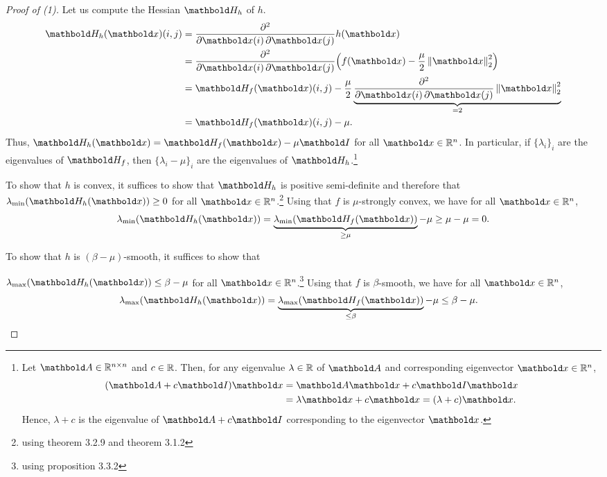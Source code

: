 \documentclass{tufte-handout}
\begin{document}
\begin{proof}[Proof of (1)] Let us compute the Hessian $\mH_h$ of $h$. \begin{align*}
    \mH_h(\vx)(i,j) &= \pdv{}{\vx(i),\vx(j)} h(\vx) \\
    &= \pdv{}{\vx(i),\vx(j)} \parentheses*{f(\vx) - \frac{\mu}{2} \norm{\vx}_2^2} \\
    &= \mH_f(\vx)(i,j) - \frac{\mu}{2} \underbrace{\pdv{}{\vx(i),\vx(j)} \norm{\vx}_2^2}_{=2} \\
    &= \mH_f(\vx)(i,j) - \mu.
\end{align*} Thus, $\mH_h(\vx) = \mH_f(\vx) - \mu \mI$ for all $\vx \in \R^n$. In particular, if $\{\lambda_i\}_i$ are the eigenvalues of $\mH_f$, then $\{\lambda_i - \mu\}_i$ are the eigenvalues of $\mH_h$.\footnote{Let $\mA \in \R^{n \times n}$ and $c \in \mathbb{R}$. Then, for any eigenvalue $\lambda \in \mathbb{R}$ of $\mA$ and corresponding eigenvector $\vx \in \R^n$, \begin{align*}
    (\mA + c \mI)\vx &= \mA\vx + c\mI\vx \\
    &= \lambda\vx + c\vx = (\lambda + c)\vx.
\end{align*} Hence, $\lambda + c$ is the eigenvalue of $\mA + c\mI$ corresponding to the eigenvector $\vx$.}

To show that $h$ is convex, it suffices to show that $\mH_h$ is positive semi-definite and therefore that $\lmin(\mH_h(\vx)) \geq 0$ for all $\vx \in \R^n$.\footnote{using theorem 3.2.9 and theorem 3.1.2} Using that $f$ is $\mu$-strongly convex, we have for all $\vx \in \R^n$, \begin{align*}
    \lmin(\mH_h(\vx)) = \underbrace{\lmin(\mH_f(\vx))}_{\geq \mu} - \mu \geq \mu - \mu = 0.
\end{align*}

To show that $h$ is $(\beta - \mu)$-smooth, it suffices to show that \par\noindent $\lmax(\mH_h(\vx)) \leq \beta - \mu$ for all $\vx \in \R^n$.\footnote{using proposition 3.3.2} Using that $f$ is $\beta$-smooth, we have for all $\vx \in \R^n$, \begin{align*}
    \lmax(\mH_h(\vx)) = \underbrace{\lmax(\mH_f(\vx))}_{\leq \beta} - \mu \leq \beta - \mu. &\qedhere
\end{align*}
\end{proof}
\end{document}

